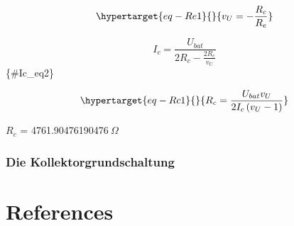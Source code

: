 \documentclass[
  letterpaper,
  DIV=11]{scrreprt}
\newlength{\cslhangindent}
\newlength{\cslentryspacingunit} %
\newenvironment{CSLReferences}[2] %
 {%
  \setlength{\parindent}{0pt}
  \ifodd #1
  \let\oldpar\par
  \def\par{\hangindent=\cslhangindent\oldpar}
  \fi
  \setlength{\parskip}{#2\cslentryspacingunit}
 }%
 {}
\begin{document}
\begin{equation}\protect\hypertarget{eq-Re1}{}{
v_{U} = - \frac{R_{c}}{R_{e}}
}\label{eq-Re1}\end{equation}

\[
I_{c} = \frac{U_{bat}}{2 R_{c} - \frac{2 R_{c}}{v_{U}}}
\]\{\#Ic\_eq2\}

\begin{equation}\protect\hypertarget{eq-Rc1}{}{
R_{c} = \frac{U_{bat} v_{U}}{2 I_{c} \left(v_{U} - 1\right)}
}\label{eq-Rc1}\end{equation}

\(R_{c}\) = 4761.90476190476\(\ \Omega\)

\hypertarget{die-kollektorgrundschaltung}{%
\subsection{Die
Kollektorgrundschaltung}\label{die-kollektorgrundschaltung}}


\hypertarget{references}{%
\chapter*{References}\label{references}}


\hypertarget{refs}{}
\begin{CSLReferences}{0}{0}
\end{CSLReferences}
\end{document}
